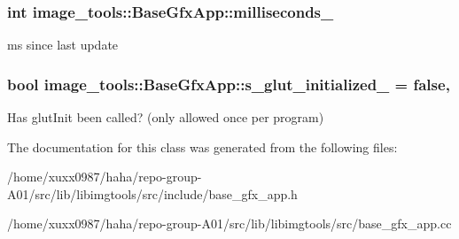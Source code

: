 \subsubsection[{\texorpdfstring{milliseconds\+\_\+}{milliseconds_}}]{\setlength{\rightskip}{0pt plus 5cm}int image\+\_\+tools\+::\+Base\+Gfx\+App\+::milliseconds\+\_\+\hspace{0.3cm}{\ttfamily [private]}}\hypertarget{classimage__tools_1_1BaseGfxApp_a2197d887035883be911d1ced510d99d9}{}\label{classimage__tools_1_1BaseGfxApp_a2197d887035883be911d1ced510d99d9}
ms since last update 
\subsubsection[{\texorpdfstring{s\+\_\+glut\+\_\+initialized\+\_\+}{s_glut_initialized_}}]{\setlength{\rightskip}{0pt plus 5cm}bool image\+\_\+tools\+::\+Base\+Gfx\+App\+::s\+\_\+glut\+\_\+initialized\+\_\+ = false\hspace{0.3cm}{\ttfamily [static]}, {\ttfamily [private]}}\hypertarget{classimage__tools_1_1BaseGfxApp_a4bfe294b3c2987edd8e8465e4047a064}{}\label{classimage__tools_1_1BaseGfxApp_a4bfe294b3c2987edd8e8465e4047a064}
Has glut\+Init been called? (only allowed once per program) 

The documentation for this class was generated from the following files\+:\begin{DoxyCompactItemize}
\item 
/home/xuxx0987/haha/repo-\/group-\/\+A01/src/lib/libimgtools/src/include/base\+\_\+gfx\+\_\+app.\+h\item 
/home/xuxx0987/haha/repo-\/group-\/\+A01/src/lib/libimgtools/src/base\+\_\+gfx\+\_\+app.\+cc\end{DoxyCompactItemize}
